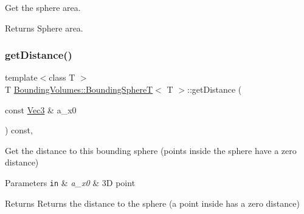 Get the sphere area. 

\begin{DoxyReturn}{Returns}
Sphere area. 
\end{DoxyReturn}
\mbox{\label{classBoundingVolumes_1_1BoundingSphereT_a06ec858b7349e6a926ad476990c774cb}} 
\subsubsection{\texorpdfstring{get\+Distance()}{getDistance()}}
{\footnotesize\ttfamily template$<$class T $>$ \\
T \hyperlink{classBoundingVolumes_1_1BoundingSphereT}{Bounding\+Volumes\+::\+Bounding\+SphereT}$<$ T $>$\+::get\+Distance (\begin{DoxyParamCaption}\item[{const \hyperlink{classBoundingVolumes_1_1BoundingSphereT_ad89ed315255abcde216e9ca1de3068ab}{Vec3} \&}]{a\+\_\+x0 }\end{DoxyParamCaption}) const\hspace{0.3cm}{\ttfamily [inline]}, {\ttfamily [noexcept]}}



Get the distance to this bounding sphere (points inside the sphere have a zero distance) 


\begin{DoxyParams}[1]{Parameters}
\mbox{\tt in}  & {\em a\+\_\+x0} & 3D point \\
\hline
\end{DoxyParams}
\begin{DoxyReturn}{Returns}
Returns the distance to the sphere (a point inside has a zero distance) 
\end{DoxyReturn}
\mbox{\label{classBoundingVolumes_1_1BoundingSphereT_a4581b87c7a3ccd3b58168bfdae9436cb}} 

